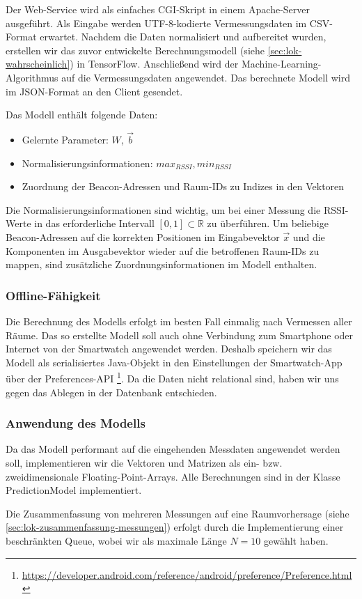 Der Web-Service wird als einfaches CGI-Skript in einem Apache-Server ausgeführt.
Als Eingabe werden UTF-8-kodierte Vermessungsdaten im CSV-Format erwartet.
Nachdem die Daten normalisiert und aufbereitet wurden, erstellen wir das
zuvor entwickelte Berechnungsmodell (siehe \ref{sec:lok-wahrscheinlich}) in
TensorFlow. Anschließend wird der Machine-Learning-Algorithmus auf die
Vermessungsdaten angewendet.
Das berechnete Modell wird im JSON-Format an den Client gesendet.

Das Modell enthält folgende Daten:
\begin{itemize}
	\item Gelernte Parameter: $W$, $\vec{b}$
	\item Normalisierungsinformationen: $max_{RSSI}, min_{RSSI}$
	\item Zuordnung der Beacon-Adressen und Raum-IDs zu Indizes in den Vektoren
\end{itemize}
Die Normalisierungsinformationen sind wichtig, um bei einer Messung die RSSI-Werte in
das erforderliche Intervall $[0, 1] \subset \mathbb{R}$ zu überführen.
Um beliebige Beacon-Adressen auf die korrekten Positionen im Eingabevektor $\vec{x}$
und die Komponenten im Ausgabevektor wieder auf die betroffenen Raum-IDs
zu mappen, sind zusätzliche Zuordnungsinformationen im Modell enthalten.

\subsubsection{Offline-Fähigkeit}

Die Berechnung des Modells erfolgt im besten Fall einmalig nach Vermessen aller Räume.
Das so erstellte Modell soll auch ohne Verbindung zum Smartphone oder Internet von
der Smartwatch angewendet werden. Deshalb speichern wir das Modell als serialisiertes
Java-Objekt in den Einstellungen der Smartwatch-App über der Preferences-API
\footnote{\url{https://developer.android.com/reference/android/preference/Preference.html}}.
Da die Daten nicht relational sind, haben wir uns gegen das Ablegen in der Datenbank
entschieden.

\subsubsection{Anwendung des Modells}

Da das Modell performant auf die eingehenden Messdaten angewendet werden soll,
implementieren wir die Vektoren und Matrizen als ein- bzw. zweidimensionale
Floating-Point-Arrays. Alle Berechnungen sind in der Klasse PredictionModel
implementiert.

Die Zusammenfassung von mehreren Messungen auf eine Raumvorhersage
(siehe \ref{sec:lok-zusammenfassung-messungen}) erfolgt durch die Implementierung
einer beschränkten Queue, wobei wir als maximale Länge $N = 10$ gewählt haben.

